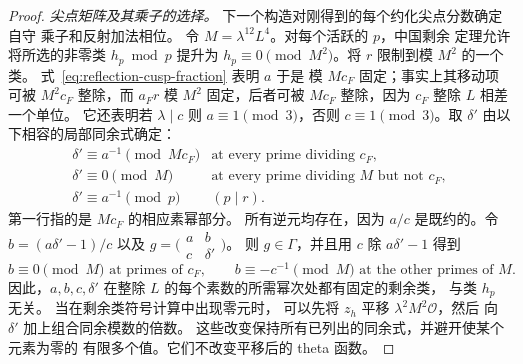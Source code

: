 \documentclass[11pt,a4paper]{article}
\numberwithin{equation}{section}
\numberwithin{figure}{section}
\theoremstyle{definition}
\theoremstyle{remark}
\begin{document}
\begin{proof}
\emph{尖点矩阵及其乘子的选择。}
下一个构造对刚得到的每个约化尖点分数确定自守
乘子和反射加法相位。
令 $M=\lambda^{12}L^4$。对每个活跃的 $p$，中国剩余
定理允许将所选的非零类 $h_p\bmod p$ 提升为
$h_p\equiv0\pmod{M^2}$。将 $r$ 限制到模 $M^2$ 的一个类。
式~\eqref{eq:reflection-cusp-fraction} 表明 $a$ 于是
模 $Mc_F$ 固定；事实上其移动项可被
$M^2c_F$ 整除，而 $a_Fr$ 模 $M^2$ 固定，后者可被
$Mc_F$ 整除，因为 $c_F$ 整除 $L$ 相差一个单位。
它还表明若 $\lambda\mid c$ 则 $a\equiv1\pmod3$，否则
$c\equiv1\pmod3$。取 $\delta'$ 由以下相容的局部同余式确定：
\[
 \begin{array}{ll}
 \delta'\equiv a^{-1}\pmod{Mc_F}
       &\text{at every prime dividing }c_F,\\
 \delta'\equiv0\pmod M
       &\text{at every prime dividing }M\text{ but not }c_F,\\
 \delta'\equiv a^{-1}\pmod p& (p\mid r).
 \end{array}
\]
第一行指的是 $Mc_F$ 的相应素幂部分。
所有逆元均存在，因为 $a/c$ 是既约的。令
$b=(a\delta'-1)/c$ 以及 $g=\bigl(\begin{smallmatrix}a&b\\c&\delta'\end{smallmatrix}\bigr)$。
则 $g\in\Gamma$，并且用 $c$ 除 $a\delta'-1$ 得到
\[
 b\equiv0\pmod M\text{ at primes of }c_F,\qquad
 b\equiv-c^{-1}\pmod M\text{ at the other primes of }M.
\]
因此，$a,b,c,\delta'$ 在整除 $L$ 的每个素数的所需幂次处都有固定的剩余类，
与类 $h_p$ 无关。
当在剩余类符号计算中出现零元时，
可以先将 $z_h$ 平移 $\lambda^2M^2\mathcal O$，然后
向 $\delta'$ 加上组合同余模数的倍数。
这些改变保持所有已列出的同余式，并避开使某个元素为零的
有限多个值。它们不改变平移后的
theta 函数。


\end{proof}
\end{document}
